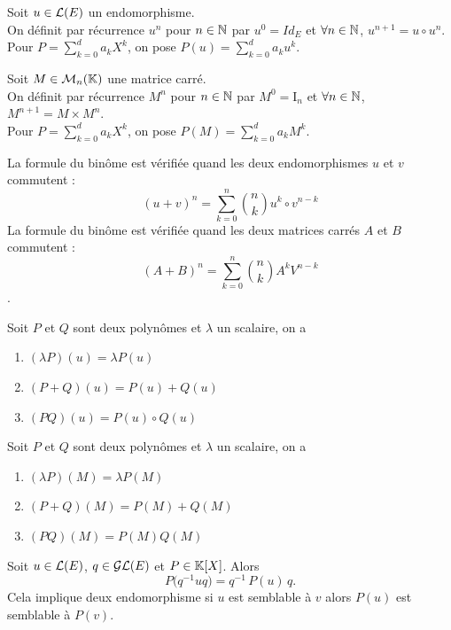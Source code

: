 \documentclass{book}
\begin{document}
\begin{Definition}
Soit $u\in  \mathcal{L}(E)$ un endomorphisme.\\
On définit par récurrence $u^n$ pour $n\in  \mathbb{N} $ par
$u^0 = Id_{E}$ et $\forall   n\in  \mathbb{N} $, $u^{n+1} = u\circ u^n$.\\
Pour $P = \sum  _{k=0}^d a_k X^k$, on pose $P(u) = \sum  _{k=0}^d a_k u^k$.
\end{Definition}
\begin{Definition}
Soit $M\in  \mathcal{M}_{n}(\mathbb{K})$ une matrice carré.\\
On définit par récurrence $M^n$ pour $n\in  \mathbb{N} $ par
$M^0 = \mathrm {I}_{n}$ et $\forall   n\in  \mathbb{N} $, $M^{n+1} = M\times M^n$.\\
Pour $P = \sum  _{k=0}^d a_k X^k$, on pose $P(M) = \sum  _{k=0}^d a_k M^k$.
\end{Definition}
\begin{Proposition}
La formule du binôme est vérifiée quand les deux endomorphismes $u$ et $v$ commutent  :
$$(u+v)^{{n}}=\sum _{{k=0}}^{{n}}{{\binom  {n}{k}}u^{{k}}\circ v^{{n-k}}}$$
La formule du binôme est vérifiée quand les deux matrices carrés $A$ et $B$ commutent  :
$$(A+B)^{{n}}=\sum _{{k=0}}^{{n}}{{\binom  {n}{k}}A^{{k}} V^{{n-k}}}$$.
\end{Proposition}
\begin{Proposition}[Propriétés]
Soit $P$ et $Q$ sont deux polynômes et $\lambda $ un scalaire, on a
\begin{enumerate}
\item $(\lambda P)(u) = \lambda P(u)$
\item $(P+Q)(u) = P(u) + Q(u)$
\item $(PQ)(u) = P(u)\circ Q(u)$
\end{enumerate}
\end{Proposition}
\begin{Proposition}[Propriétés]
Soit $P$ et $Q$ sont deux polynômes et $\lambda $ un scalaire, on a
\begin{enumerate}
\item $(\lambda P)(M) = \lambda P(M)$
\item $(P+Q)(M) = P(M) + Q(M)$
\item $(PQ)(M) = P(M) Q(M)$
\end{enumerate}
\end{Proposition}
\begin{Proposition}[Conjugaison]
Soit $u\in  \mathcal{L}(E)$, $q\in  \mathcal{GL}(E)$ et $P\in  \mathbb{K} [X]$.
Alors
\[ P \bigl( q^{-1}uq \bigr) = q^{-1} \, P(u) \, q. \]
Cela implique deux endomorphisme si $u$ est semblable à $v$ alors $P(u)$ est semblable à $P(v)$.
\end{Proposition}
\end{document}
